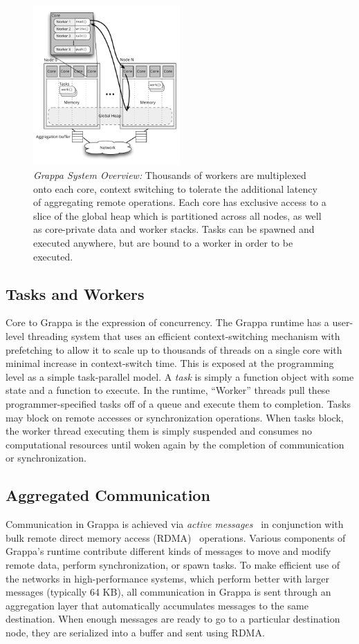\begin{figure}[t]
  \centering
  \includegraphics[width=0.5\textwidth]{figs/grappa_system.pdf}
  \caption{\emph{Grappa System Overview:}
    Thousands of workers are multiplexed onto each core, context switching to tolerate the additional latency of aggregating remote operations. Each core has exclusive access to a slice of the global heap which is partitioned across all nodes, as well as core-private data and worker stacks. Tasks can be spawned and executed anywhere, but are bound to a worker in order to be executed.
  }
  \label{fig:system}
\end{figure}

\subsection{Tasks and Workers}
Core to Grappa is the expression of concurrency. The Grappa runtime has a user-level threading system that uses an efficient context-switching mechanism with prefetching to allow it to scale up to thousands of threads on a single core with minimal increase in context-switch time. This is exposed at the programming level as a simple task-parallel model. A \emph{task} is simply a function object with some state and a function to execute. In the runtime, ``Worker'' threads pull these programmer-specified tasks off of a queue and execute them to completion. Tasks may block on remote accesses or synchronization operations. When tasks block, the worker thread executing them is simply suspended and consumes no computational resources until woken again by the completion of communication or synchronization.

\subsection{Aggregated Communication}
Communication in Grappa is achieved via \emph{active messages}~\cite{vonEicken92} in conjunction with bulk remote direct memory access (RDMA)~ operations. Various components of Grappa's runtime contribute different kinds of messages to move and modify remote data, perform synchronization, or spawn tasks. To make efficient use of the networks in high-performance systems, which perform better with larger messages (typically 64 KB), all communication in Grappa is sent through an aggregation layer that automatically accumulates messages to the same destination. When enough messages are ready to go to a particular destination node, they are serialized into a buffer and sent using RDMA.

